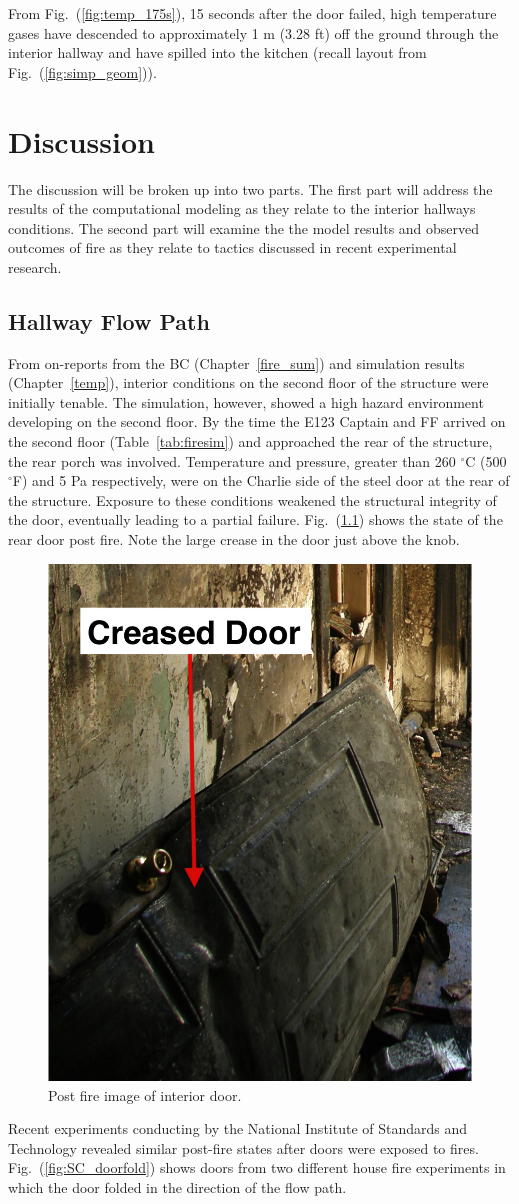 \documentclass[11pt,oneside]{book}
\begin{document}
From Fig.~(\ref{fig:temp_175s}), 15 seconds after the door failed, high temperature gases have descended to approximately 1 m (3.28 ft) off the ground through the interior hallway and have spilled into the kitchen (recall layout from Fig.~(\ref{fig:simp_geom})).


\chapter{Discussion}
The discussion will be broken up into two parts. The first part will address the results of the computational modeling as they relate to the interior hallways conditions. The second part will examine the the model results and observed outcomes of fire as they relate to tactics discussed in recent experimental research. 

\section{Hallway Flow Path}
From on-reports from the BC (Chapter~\ref{fire_sum}) and simulation results (Chapter~\ref{temp}), interior conditions on the second floor of the structure were initially tenable. The simulation, however, showed a high hazard environment developing on the second floor. By the time the E123 Captain and FF arrived on the second floor (Table~\ref{tab:firesim}) and approached the rear of the structure, the rear porch was involved. Temperature and pressure, greater than 260 $^{\circ}$C (500 $^{\circ}$F) and 5 Pa respectively, were on the Charlie side of the steel door at the rear of the structure. Exposure to these conditions weakened the structural integrity of the door, eventually leading to a partial failure. Fig.~(\ref{fig:chicago_doorfold}) shows the state of the rear door post fire. Note the large crease in the door just above the knob.

\begin{figure}[h!]
\centering
\includegraphics[width=.4\textwidth]{../Figures/Porch_Door_1}
\caption{Post fire image of interior door.}
\label{fig:chicago_doorfold}
\end{figure}
Recent experiments conducting by the National Institute of Standards and Technology revealed similar post-fire states after doors were exposed to fires. Fig.~(\ref{fig:SC_doorfold}) shows doors from two different house fire experiments in which the door folded in the direction of the flow path.
\end{document}
